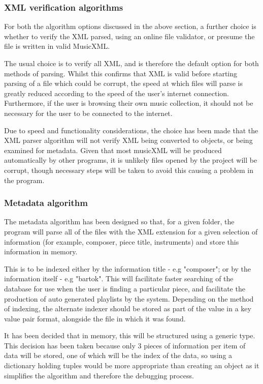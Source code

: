 \subsubsection{XML verification algorithms}
For both the algorithm options discussed in the above section, a further choice is whether to verify the XML parsed, using an online file validator, or presume the file is written in valid MusicXML. 

The usual choice is to verify all XML, and is therefore the default option for both methods of parsing. Whilst this confirms that XML is valid before starting parsing of a file which could be corrupt, the speed at which files will parse is greatly reduced according to the speed of the user's internet connection.
Furthermore, if the user is browsing their own music collection, it should not be necessary for the user to be connected to the internet.

Due to speed and functionality considerations, the choice has been made that the XML parser algorithm will not verify XML being converted to objects, or being examined for metadata. Given that most musicXML will be produced automatically by other programs, it is unlikely files opened by the project will be corrupt, though necessary steps will be taken to avoid this causing a problem in the program.

\subsubsection{Metadata algorithm}
The metadata algorithm has been designed so that, for a given folder, the program will parse all of the files with the XML extension for a given selection of information (for example, composer, piece title, instruments) and store this information in memory. 

This is to be indexed either by the information title - e.g "composer"; or by the information itself - e.g "bartok". This will facilitate faster searching of the database for use when the user is finding a particular piece, and facilitate the production of auto generated playlists by the system. Depending on the method of indexing, the alternate indexer should be stored as part of the value in a key value pair format, alongside the file in which it was found.

It has been decided that in memory, this will be structured using a generic type. This decision has been taken because only 3 pieces of information per item of data will be stored, one of which will be the index of the data, so using a dictionary holding tuples would be more appropriate than creating an object as it simplifies the algorithm and therefore the debugging process.


